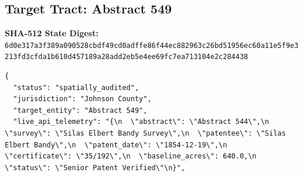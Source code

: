 \documentclass{article}
\begin{document}
\subsection*{Target Tract: Abstract 549}
\textbf{SHA-512 State Digest:}\\
\texttt{6d0e317a3f389a090528cbdf49cd0adffe86f44ec882963c26bd51956ec60a11e5f9e3213fd3cfda1b610d457189a28add2eb5e4ee69fc7ea713104e2c284438}
\begin{verbatim}
{
  "status": "spatially_audited",
  "jurisdiction": "Johnson County",
  "target_entity": "Abstract 549",
  "live_api_telemetry": "{\n  \"abstract\": \"Abstract 544\",\n  \"survey\": \"Silas Elbert Bandy Survey\",\n  \"patentee\": \"Silas Elbert Bandy\",\n  \"patent_date\": \"1854-12-19\",\n  \"certificate\": \"35/192\",\n  \"baseline_acres\": 640.0,\n  \"status\": \"Senior Patent Verified\"\n}",

\end{verbatim}
\end{document}
